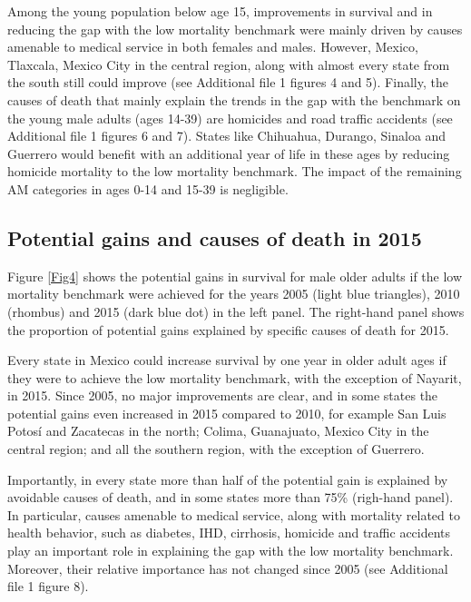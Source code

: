 \documentclass{bmcart}
\begin{document}
Among the young population below age 15, improvements in survival and in reducing the gap with the low mortality benchmark were mainly driven by causes amenable to medical service in both females and males. However,  Mexico, Tlaxcala, Mexico City in the central region, along with almost every state from the south still could improve (see Additional file 1 figures 4 and 5). Finally, the causes of death that mainly explain the trends in the gap with the benchmark on the young male adults (ages 14-39) are homicides and road traffic accidents (see Additional file 1 figures 6 and 7). States like Chihuahua, Durango, Sinaloa and Guerrero would benefit with an additional year of life in these ages by reducing homicide mortality to the low mortality benchmark. The impact of the remaining  AM categories in ages 0-14 and 15-39 is negligible. \\



\subsection*{Potential gains and causes of death in 2015}

Figure \ref{Fig4} shows the potential gains in survival for male older adults if the low mortality benchmark were achieved for the years 2005 (light blue triangles), 2010 (rhombus) and 2015 (dark blue dot) in the left panel. The right-hand panel shows the proportion of potential gains explained by specific causes of death for 2015.

Every state in Mexico could increase survival by one year in older adult ages if they were to achieve the low mortality benchmark, with the exception of Nayarit, in 2015. Since 2005, no major improvements are clear, and in some states the potential gains even increased in 2015 compared to 2010, for example San Luis Potos\'i and Zacatecas in the north; Colima, Guanajuato, Mexico City in the central region; and all the southern region, with the exception of Guerrero. 

Importantly, in every state more than half of the potential gain is explained by avoidable causes of death, and in some states more than 75\% (righ-hand panel). In particular, causes amenable to medical service, along with mortality related to health behavior, such as diabetes, IHD, cirrhosis, homicide and traffic accidents play an important role in explaining the gap with the low mortality benchmark. Moreover, their relative importance has not changed since 2005 (see Additional file 1 figure 8).\\
\end{document}
